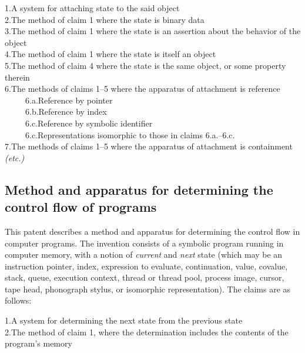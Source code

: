 \documentclass[acmtocl]%
{boviktrans}
\begin{document}
1.\quad A system for attaching state to the said object \\

2.\quad The method of claim 1 where the state is binary data \\

3.\quad The method of claim 1 where the state is an assertion about the behavior of the object \\

4.\quad The method of claim 1 where the state is itself an object \\

5.\quad The method of claim 4 where the state is the same object, or some property therein \\

6.\quad The methods of claims 1--5 where the apparatus of attachment is reference \\
\,\,\,\,\,\,\,\,\,\,\,\,\, 6.a.\quad Reference by pointer \\
\,\,\,\,\,\,\,\,\,\,\,\,\, 6.b.\quad Reference by index \\
\,\,\,\,\,\,\,\,\,\,\,\,\, 6.c.\quad Reference by symbolic identifier \\
\,\,\,\,\,\,\,\,\,\,\,\,\, 6.c.\quad Representations isomorphic to those in claims 6.a.--6.c. \\

7.\quad The methods of claims 1--5 where the apparatus of attachment is containment \\

{\it (etc.)}

\subsection{Method and apparatus for determining the control flow of programs}

This patent describes a method and apparatus for determining the
control flow in computer programs. The invention consists of a
symbolic program running in computer memory, with a notion of {\it
  current} and {\it next} state (which may be an instruction pointer,
index, expression to evaluate, continuation, value, covalue, stack,
queue, execution context, thread or thread pool, process image,
cursor, tape head, phonograph stylus, or isomorphic
representation). The claims are as follows:

1.\quad A system for determining the next state from the previous state \\

2.\quad The method of claim 1, where the determination includes the contents of the program's memory \\
\end{document}
